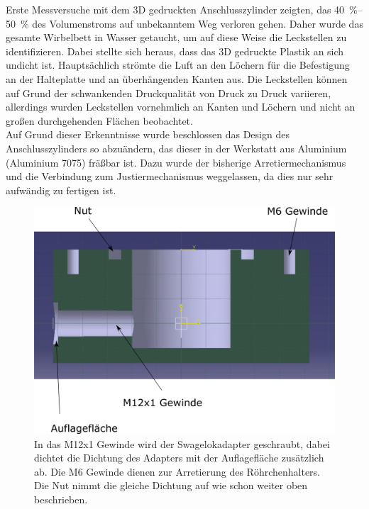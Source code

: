 Erste Messversuche mit dem 3D gedruckten Anschlusszylinder zeigten, das \SIrange{40}{50}{\%} des Volumenstroms auf unbekanntem Weg verloren gehen. Daher wurde das gesamte Wirbelbett in Wasser getaucht, um auf diese Weise die Leckstellen zu identifizieren. Dabei stellte sich heraus, dass das 3D gedruckte Plastik an sich undicht ist. Hauptsächlich strömte die Luft an den Löchern für die Befestigung an der Halteplatte und an überhängenden Kanten aus. Die Leckstellen können auf Grund der schwankenden Druckqualität von Druck zu Druck variieren, allerdings wurden Leckstellen vornehmlich an Kanten und Löchern und nicht an großen durchgehenden Flächen beobachtet. \\
Auf Grund dieser Erkenntnisse wurde beschlossen das Design des Anschlusszylinders so abzuändern, das dieser in der Werkstatt aus Aluminium (Aluminium 7075) fräßbar ist. Dazu wurde der bisherige Arretiermechanismus und die Verbindung zum Justiermechanismus weggelassen, da dies nur sehr aufwändig zu fertigen ist.

\begin{figure}[h]
	\begin{center}
		\includegraphics[scale=0.5]{Schnitt_AnschlusszylinderV2.png}
		\caption[Schnitt Zylinder V2]{In das M12x1 Gewinde wird der Swagelokadapter geschraubt, dabei dichtet die Dichtung des Adapters mit der Auflagefläche zusätzlich ab. Die M6 Gewinde dienen zur Arretierung des Röhrchenhalters. Die Nut nimmt die gleiche Dichtung auf wie schon weiter oben beschrieben.}
	\end{center}
\end{figure}

